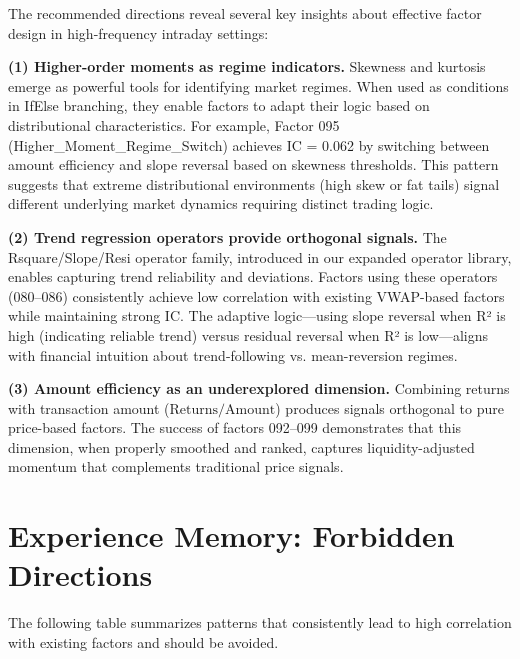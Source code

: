 \documentclass[sigconf]{acmart}
\begin{document}
The recommended directions reveal several key insights about effective factor design in high-frequency intraday settings:

\textbf{(1) Higher-order moments as regime indicators.}
Skewness and kurtosis emerge as powerful tools for identifying market regimes.
When used as conditions in IfElse branching, they enable factors to adapt their logic based on distributional characteristics.
For example, Factor 095 (Higher\_Moment\_Regime\_Switch) achieves IC = 0.062 by switching between amount efficiency and slope reversal based on skewness thresholds.
This pattern suggests that extreme distributional environments (high skew or fat tails) signal different underlying market dynamics requiring distinct trading logic.

\textbf{(2) Trend regression operators provide orthogonal signals.}
The Rsquare/Slope/Resi operator family, introduced in our expanded operator library, enables capturing trend reliability and deviations.
Factors using these operators (080--086) consistently achieve low correlation with existing VWAP-based factors while maintaining strong IC.
The adaptive logic---using slope reversal when R² is high (indicating reliable trend) versus residual reversal when R² is low---aligns with financial intuition about trend-following vs. mean-reversion regimes.

\textbf{(3) Amount efficiency as an underexplored dimension.}
Combining returns with transaction amount ($\text{Returns}/\text{Amount}$) produces signals orthogonal to pure price-based factors.
The success of factors 092--099 demonstrates that this dimension, when properly smoothed and ranked, captures liquidity-adjusted momentum that complements traditional price signals.

\section{Experience Memory: Forbidden Directions}
\label{app:forbidden}

The following table summarizes patterns that consistently lead to high correlation with existing factors and should be avoided.
\end{document}

